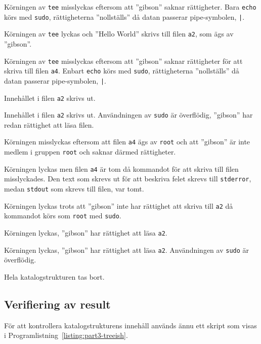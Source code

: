              {Körningen av \texttt{tee} misslyckas eftersom att ''gibson''
              saknar rättigheter. Bara \texttt{echo} körs med \texttt{sudo},
              rättigheterna ''nollställs'' då datan passerar pipe-symbolen,
              \texttt{|}.}

             {Körningen av \texttt{tee} lyckas och ''Hello World'' skrivs
              till filen \texttt{a2}, som ägs av ''gibson''.}

             {Körningen av \texttt{tee} misslyckas eftersom att ''gibson''
              saknar rättigheter för att skriva till filen \texttt{a4}. 
              Enbart \texttt{echo} körs med \texttt{sudo}, rättigheterna
              ''nollställs'' då datan passerar pipe-symbolen, \texttt{|}.}

             {Innehållet i filen \texttt{a2} skrivs ut.}

             {Innehållet i filen \texttt{a2} skrivs ut. Användningen av
              \texttt{sudo} är överflödig, ''gibson'' har redan rättighet att
              läsa filen.}

             {Körningen misslyckas eftersom att filen \texttt{a4} ägs av
              \texttt{root} och att ''gibson'' är inte medlem i gruppen 
              \texttt{root} och saknar därmed rättigheter.}

             {Körningen lyckas men filen \texttt{a4} är tom då kommandot för
              att skriva till filen misslyckades. Den text som skrevs ut för
              att beskriva felet skrevs till \texttt{stderror}, medan 
              \texttt{stdout} som skrevs till filen, var tomt.}

             {Körningen lyckas trots att ''gibson'' inte har rättighet att
              skriva till \texttt{a2} då kommandot körs som \texttt{root} med
              \texttt{sudo}.}

             {Körningen lyckas, ''gibson'' har rättighet att läsa \texttt{a2}.}

             {Körningen lyckas, ''gibson'' har rättighet att läsa \texttt{a2}.
              Användningen av \texttt{sudo} är överflödig.}

             {Hela katalogstrukturen tas bort.}

\subsection{Verifiering av result}
För att kontrollera katalogstrukturens innehåll används ännu ett skript som visas
i Programlistning~\ref{listing:part3-treeish}.

